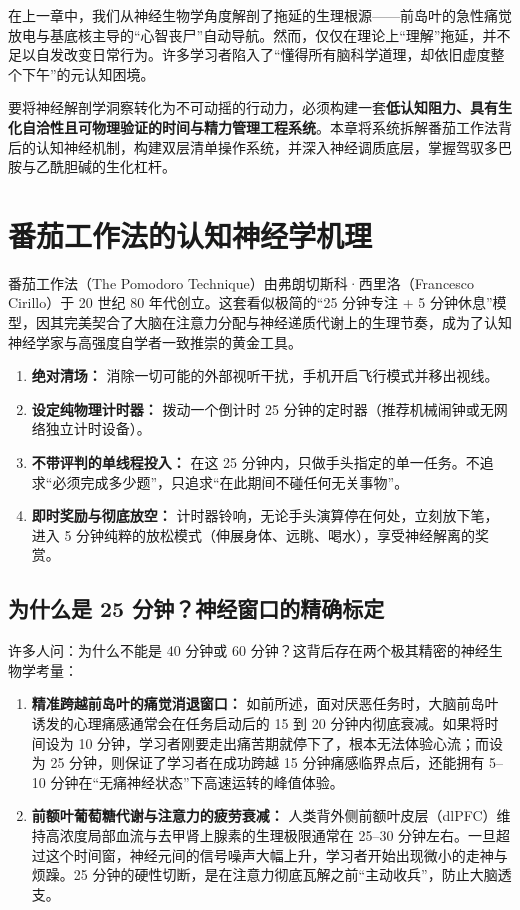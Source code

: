 \documentclass[12pt,a4paper,openany]{ctexbook}
\begin{document}
在上一章中，我们从神经生物学角度解剖了拖延的生理根源——前岛叶的急性痛觉放电与基底核主导的“心智丧尸”自动导航。然而，仅仅在理论上“理解”拖延，并不足以自发改变日常行为。许多学习者陷入了“懂得所有脑科学道理，却依旧虚度整个下午”的元认知困境。

要将神经解剖学洞察转化为不可动摇的行动力，必须构建一套\textbf{低认知阻力、具有生化自洽性且可物理验证的时间与精力管理工程系统}。本章将系统拆解番茄工作法背后的认知神经机制，构建双层清单操作系统，并深入神经调质底层，掌握驾驭多巴胺与乙酰胆碱的生化杠杆。

\section{番茄工作法的认知神经学机理}

番茄工作法（The Pomodoro Technique）由弗朗切斯科·西里洛（Francesco Cirillo）于 20 世纪 80 年代创立。这套看似极简的“25 分钟专注 + 5 分钟休息”模型，因其完美契合了大脑在注意力分配与神经递质代谢上的生理节奏，成为了认知神经学家与高强度自学者一致推崇的黄金工具。

\begin{keypoint}
\begin{enumerate}
    \item \textbf{绝对清场：} 消除一切可能的外部视听干扰，手机开启飞行模式并移出视线。
    \item \textbf{设定纯物理计时器：} 拨动一个倒计时 25 分钟的定时器（推荐机械闹钟或无网络独立计时设备）。
    \item \textbf{不带评判的单线程投入：} 在这 25 分钟内，只做手头指定的单一任务。不追求“必须完成多少题”，只追求“在此期间不碰任何无关事物”。
    \item \textbf{即时奖励与彻底放空：} 计时器铃响，无论手头演算停在何处，立刻放下笔，进入 5 分钟纯粹的放松模式（伸展身体、远眺、喝水），享受神经解离的奖赏。
\end{enumerate}
\end{keypoint}

\subsection*{为什么是 25 分钟？神经窗口的精确标定}

许多人问：为什么不能是 40 分钟或 60 分钟？这背后存在两个极其精密的神经生物学考量：

\begin{enumerate}
    \item \textbf{精准跨越前岛叶的痛觉消退窗口：}
    如前所述，面对厌恶任务时，大脑前岛叶诱发的心理痛感通常会在任务启动后的 15 到 20 分钟内彻底衰减。如果将时间设为 10 分钟，学习者刚要走出痛苦期就停下了，根本无法体验心流；而设为 25 分钟，则保证了学习者在成功跨越 15 分钟痛感临界点后，还能拥有 5--10 分钟在“无痛神经状态”下高速运转的峰值体验。
    
    \item \textbf{前额叶葡萄糖代谢与注意力的疲劳衰减：}
    人类背外侧前额叶皮层（dlPFC）维持高浓度局部血流与去甲肾上腺素的生理极限通常在 25--30 分钟左右。一旦超过这个时间窗，神经元间的信号噪声大幅上升，学习者开始出现微小的走神与烦躁。25 分钟的硬性切断，是在注意力彻底瓦解之前“主动收兵”，防止大脑透支。
\end{enumerate}
\end{document}
